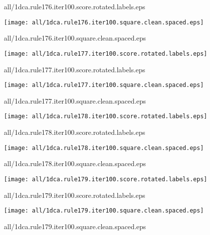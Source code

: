 \documentclass{article}
\begin{document}
{\footnotesize all/1dca.rule176.iter100.score.rotated.labels.eps}
\begin{center}
\begin{minipage}{\textwidth}
\texttt{[image: all/1dca.rule176.iter100.square.clean.spaced.eps]}
\end{minipage}
\end{center}
{\footnotesize all/1dca.rule176.iter100.square.clean.spaced.eps}
\begin{center}
\begin{minipage}{\textwidth}
\texttt{[image: all/1dca.rule177.iter100.score.rotated.labels.eps]}
\end{minipage}
\end{center}
{\footnotesize all/1dca.rule177.iter100.score.rotated.labels.eps}
\begin{center}
\begin{minipage}{\textwidth}
\texttt{[image: all/1dca.rule177.iter100.square.clean.spaced.eps]}
\end{minipage}
\end{center}
{\footnotesize all/1dca.rule177.iter100.square.clean.spaced.eps}
\begin{center}
\begin{minipage}{\textwidth}
\texttt{[image: all/1dca.rule178.iter100.score.rotated.labels.eps]}
\end{minipage}
\end{center}
{\footnotesize all/1dca.rule178.iter100.score.rotated.labels.eps}
\begin{center}
\begin{minipage}{\textwidth}
\texttt{[image: all/1dca.rule178.iter100.square.clean.spaced.eps]}
\end{minipage}
\end{center}
{\footnotesize all/1dca.rule178.iter100.square.clean.spaced.eps}
\begin{center}
\begin{minipage}{\textwidth}
\texttt{[image: all/1dca.rule179.iter100.score.rotated.labels.eps]}
\end{minipage}
\end{center}
{\footnotesize all/1dca.rule179.iter100.score.rotated.labels.eps}
\begin{center}
\begin{minipage}{\textwidth}
\texttt{[image: all/1dca.rule179.iter100.square.clean.spaced.eps]}
\end{minipage}
\end{center}
{\footnotesize all/1dca.rule179.iter100.square.clean.spaced.eps}
\end{document}
